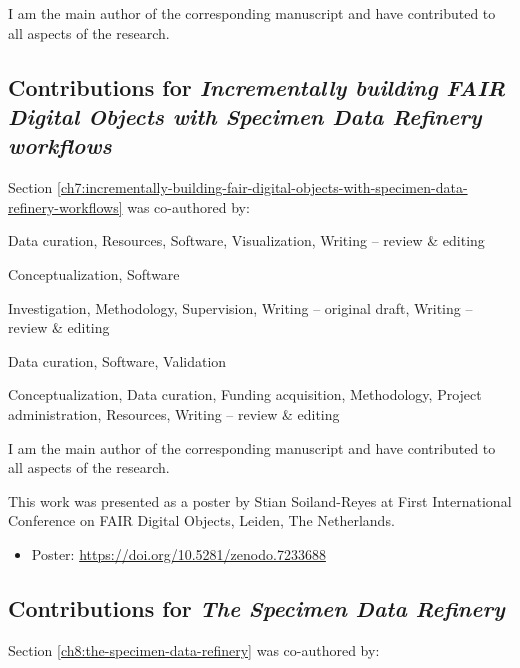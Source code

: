 I am the main author of the corresponding manuscript and have contributed to all aspects of the research. 


\subsection{Contributions for \emph{Incrementally
building FAIR Digital Objects with Specimen Data Refinery workflows}}

Section \vref{ch7:incrementally-building-fair-digital-objects-with-specimen-data-refinery-workflows} was co-authored by:

\begin{description}
\tightlist
\item[Oliver Woolland]
Data curation, Resources, Software, Visualization, Writing -- review \&
editing
\item[Paul Brack]
Conceptualization, Software
\item[Stian Soiland-Reyes]
Investigation, Methodology, Supervision, Writing -- original draft,
Writing -- review \& editing
\item[Ben Scott]
Data curation, Software, Validation
\item[Laurence Livermore]
Conceptualization, Data curation, Funding acquisition, Methodology,
Project administration, Resources, Writing -- review \& editing
\end{description}

I am the main author of the corresponding manuscript and have contributed to all aspects of the research. 


This work was presented as a poster by Stian Soiland-Reyes at First International Conference on FAIR Digital Objects, Leiden, The Netherlands.

\begin{itemize}
\tightlist
\item
  Poster: \url{https://doi.org/10.5281/zenodo.7233688}
\end{itemize}


\subsection{Contributions for \emph{The Specimen Data
Refinery}}

Section \vref{ch8:the-specimen-data-refinery} was co-authored by:

